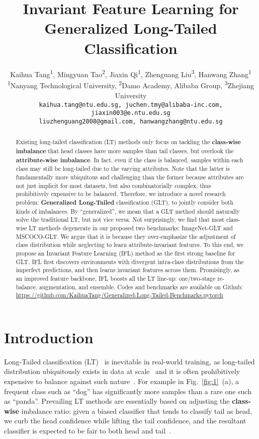 \documentclass{article}
\title{Invariant Feature Learning for Generalized Long-Tailed Classification}
\author{
 Kaihua Tang\textsuperscript{1}, \quad Mingyuan Tao\textsuperscript{2}, \quad Jiaxin Qi\textsuperscript{1}, \quad  Zhenguang Liu\textsuperscript{3}, \quad Hanwang Zhang\textsuperscript{1} \\
{\small \textsuperscript{1}Nanyang Technological University, \quad \textsuperscript{2}Damo Academy, Alibaba Group, \quad \textsuperscript{3}Zhejiang University}\\
{\tt\small kaihua.tang@ntu.edu.sg, \quad juchen.tmy@alibaba-inc.com, \quad jiaxin003@e.ntu.edu.sg}\\
{\tt\small liuzhenguang2008@gmail.com, \quad hanwangzhang@ntu.edu.sg}
}
\begin{document}
\maketitle


\begin{abstract}
 Existing long-tailed classification (LT) methods only focus on tackling the \textbf{class-wise imbalance} that head classes have more samples than tail classes, but overlook the \textbf{attribute-wise imbalance}. In fact, even if the class is balanced, samples within each class may still be long-tailed due to the varying attributes. Note that the latter is fundamentally more ubiquitous and challenging than the former because attributes are not just implicit for most datasets, but also combinatorially complex, thus prohibitively expensive to be balanced. Therefore, we introduce a novel research problem: \textbf{Generalized Long-Tailed} classification (GLT), to jointly consider both kinds of imbalances. By ``generalized'', we mean that a GLT method should naturally solve the traditional LT, but not vice versa. Not surprisingly, we find that most class-wise LT methods degenerate in our proposed two benchmarks: ImageNet-GLT and MSCOCO-GLT. We argue that it is because they over-emphasize the adjustment of class distribution while neglecting to learn attribute-invariant features. To this end, we propose an Invariant Feature Learning (IFL) method as the first strong baseline for GLT. IFL first discovers environments with divergent intra-class distributions from the imperfect predictions, and then learns invariant features across them. Promisingly, as an improved feature backbone, IFL boosts all the LT line-up: one/two-stage re-balance, augmentation, and ensemble. Codes and benchmarks are available on Github: \url{https://github.com/KaihuaTang/Generalized-Long-Tailed-Benchmarks.pytorch}
\end{abstract}

\section{Introduction}
\label{sec:1}

Long-Tailed classification (LT)~\cite{zhang2021deep} is inevitable in real-world training, as long-tailed distribution ubiquitously exists in data at scale~\cite{reed2001pareto,powers1998applications} and it is often prohibitively expensive to balance against such nature~\cite{reed2001pareto}. For example in Fig.~\ref{fig:1}~(a), a frequent class such as ``dog'' has significantly more samples than a rare one such as ``panda''. Prevailing LT methods are essentially based on adjusting the \textbf{class-wise} imbalance ratio: given a biased classifier that tends to classify tail as head, we curb the head confidence while lifting the tail confidence, and the resultant classifier is expected to be fair to both head and tail~\cite{kang2019decoupling,zhou2019bbn,cao2019ldam,menon2020long,ren2020balanced}. 
\end{document}
